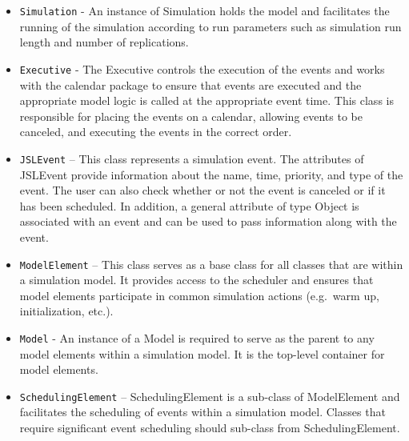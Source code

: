 \documentclass[
]{book}
\theoremstyle{definition}
\theoremstyle{definition}
\theoremstyle{definition}
\theoremstyle{definition}
\theoremstyle{remark}
\begin{document}
\begin{itemize}
\item
  \texttt{Simulation} - An instance of Simulation holds the model and
  facilitates the running of the simulation according to run
  parameters such as simulation run length and number of replications.
\item
  \texttt{Executive} - The Executive controls the execution of the events and
  works with the calendar package to ensure that events are executed
  and the appropriate model logic is called at the appropriate event
  time. This class is responsible for placing the events on a
  calendar, allowing events to be canceled, and executing the events
  in the correct order.
\item
  \texttt{JSLEvent} -- This class represents a simulation event. The
  attributes of JSLEvent provide information about the name, time,
  priority, and type of the event. The user can also check whether or
  not the event is canceled or if it has been scheduled. In addition,
  a general attribute of type Object is associated with an event and
  can be used to pass information along with the event.
\item
  \texttt{ModelElement} -- This class serves as a base class for all classes
  that are within a simulation model. It provides access to the
  scheduler and ensures that model elements participate in common
  simulation actions (e.g.~warm up, initialization, etc.).
\item
  \texttt{Model} - An instance of a Model is required to serve as the parent
  to any model elements within a simulation model. It is the top-level
  container for model elements.
\item
  \texttt{SchedulingElement} -- SchedulingElement is a sub-class of
  ModelElement and facilitates the scheduling of events within a
  simulation model. Classes that require significant event scheduling
  should sub-class from SchedulingElement.
\end{itemize}
\end{document}
